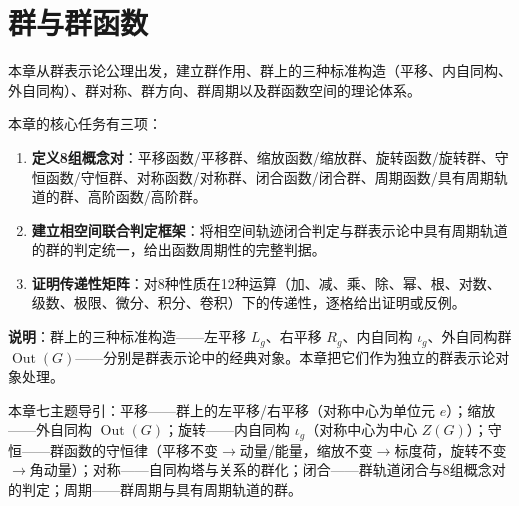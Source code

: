 \chapter{群与群函数}
\label{chap:group_function}

\begin{remark}[本章定位]\label{rem:group_function_chapter_positioning}
本章从群表示论公理出发，建立群作用、群上的三种标准构造（平移、内自同构、外自同构）、群对称、群方向、群周期以及群函数空间的理论体系。

本章的核心任务有三项：
\begin{enumerate}[label=(\arabic*)]
    \item \textbf{定义8组概念对}：平移函数/平移群、缩放函数/缩放群、旋转函数/旋转群、守恒函数/守恒群、对称函数/对称群、闭合函数/闭合群、周期函数/具有周期轨道的群、高阶函数/高阶群。
    \item \textbf{建立相空间联合判定框架}：将相空间轨迹闭合判定与群表示论中具有周期轨道的群的判定统一，给出函数周期性的完整判据。
    \item \textbf{证明传递性矩阵}：对8种性质在12种运算（加、减、乘、除、幂、根、对数、级数、极限、微分、积分、卷积）下的传递性，逐格给出证明或反例。
\end{enumerate}

\textbf{说明}：群上的三种标准构造——左平移 $L_g$、右平移 $R_g$、内自同构 $\iota_g$、外自同构群 $\operatorname{Out}(G)$——分别是群表示论中的经典对象。本章把它们作为独立的群表示论对象处理。

本章七主题导引：平移——群上的左平移/右平移（对称中心为单位元 $e$）；缩放——外自同构 $\operatorname{Out}(G)$；旋转——内自同构 $\iota_g$（对称中心为中心 $Z(G)$）；守恒——群函数的守恒律（平移不变$\to$动量/能量，缩放不变$\to$标度荷，旋转不变$\to$角动量）；对称——自同构塔与关系的群化；闭合——群轨道闭合与8组概念对的判定；周期——群周期与具有周期轨道的群。
\end{remark}

